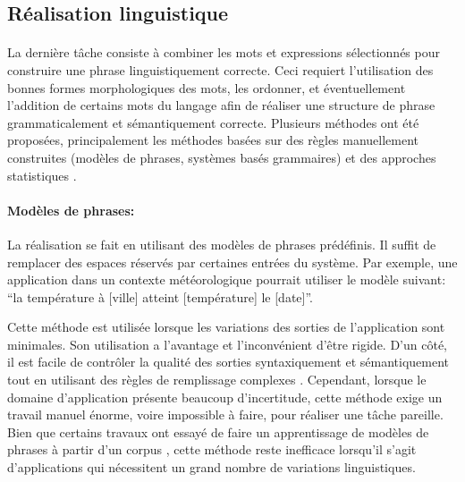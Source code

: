 \subsection{Réalisation linguistique}
\paragraph{}
La dernière tâche consiste à combiner les mots et expressions sélectionnés pour construire une phrase linguistiquement correcte. Ceci requiert l'utilisation des bonnes formes morphologiques des mots, les ordonner, et éventuellement  l'addition de certains mots du langage afin de réaliser une structure de phrase grammaticalement et sémantiquement correcte. Plusieurs méthodes ont été proposées, principalement les méthodes basées sur des règles manuellement construites (modèles de phrases, systèmes basés grammaires) et des approches statistiques \citep{Gatt2018}.
\paragraph{Modèles de phrases:} La réalisation se fait en utilisant des modèles de phrases prédéfinis. Il suffit de remplacer des espaces réservés par certaines entrées du système. Par exemple, une application dans un contexte météorologique pourrait utiliser le modèle suivant: “la température à [ville] atteint [température]\textdegree{} le [date]”.
\par Cette méthode est utilisée lorsque les variations des sorties de l'application sont minimales. Son utilisation a l'avantage et l'inconvénient d'être rigide. D'un côté, il est facile de contrôler la qualité des sorties syntaxiquement et sémantiquement tout en utilisant des règles de remplissage complexes \citep{Theune2001}. Cependant, lorsque le domaine d'application présente beaucoup d'incertitude, cette méthode exige un travail manuel énorme, voire impossible à faire, pour réaliser une tâche pareille. Bien que certains travaux ont essayé de faire un apprentissage de modèles de phrases à partir d'un corpus \citep{Angeli2012}, cette méthode reste inefficace lorsqu'il s'agit d'applications qui nécessitent un grand nombre de variations linguistiques.
